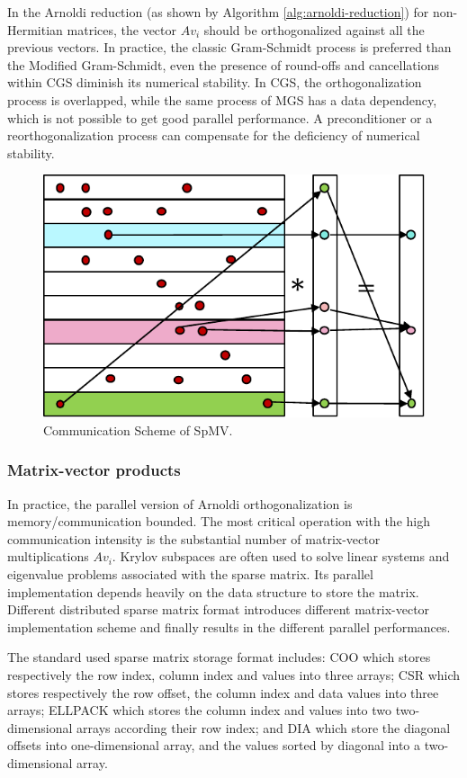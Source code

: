 {In the Arnoldi reduction (as shown by Algorithm \ref{alg:arnoldi-reduction}) for non-Hermitian matrices, the vector $Av_i$ should be orthogonalized against all the previous vectors. In practice, the classic Gram-Schmidt process is preferred than the Modified Gram-Schmidt, even the presence of round-offs and cancellations within CGS diminish its numerical stability. In CGS, the orthogonalization process is overlapped, while the same process of MGS has a data dependency, which is not possible to get good parallel performance. A preconditioner or a reorthogonalization process can compensate for the deficiency of numerical stability.

\begin{figure}[h]
	\centering
	\includegraphics[width=4.8in]{fig/spmv.pdf}
	\caption{Communication Scheme of SpMV.}
	\label{fig:spmv}
\end{figure}

\subsubsection{Matrix-vector products}

In practice, the parallel version of Arnoldi orthogonalization is memory/communication bounded. The most critical operation with the high communication intensity is the substantial number of matrix-vector multiplications $Av_i$. Krylov subspaces are often used to solve linear systems and eigenvalue problems associated with the sparse matrix. Its parallel implementation depends heavily on the data structure to store the matrix. Different distributed sparse matrix format introduces different matrix-vector implementation scheme and finally results in the different parallel performances.

The standard used sparse matrix storage format includes: COO which stores respectively the row index, column index and values into three arrays; CSR which stores respectively the row offset, the column index and data values into three arrays; ELLPACK which stores the column index and values into two two-dimensional arrays according their row index; and DIA which store the diagonal offsets into one-dimensional array, and the values sorted by diagonal into a two-dimensional array.

}
